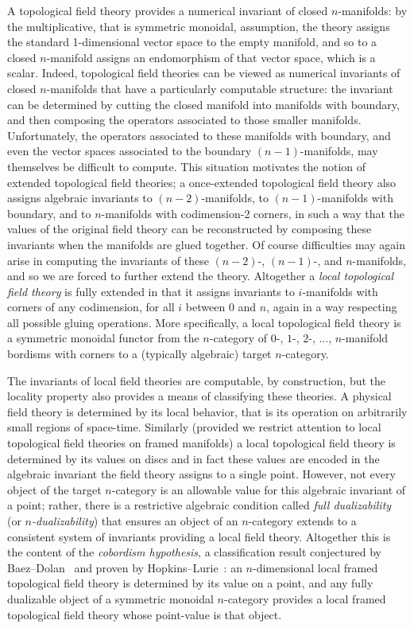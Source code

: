\documentclass{amsart}
\begin{document}
A topological field theory provides a numerical invariant of closed $n$-manifolds: by the multiplicative, that is symmetric monoidal, assumption, the theory assigns the standard 1-dimensional vector space to the empty manifold, and so to a closed $n$-manifold assigns an endomorphism of that vector space, which is a scalar.  Indeed, topological field theories can be viewed as numerical invariants of closed $n$-manifolds that have a particularly computable structure: the invariant can be determined by cutting the closed manifold into manifolds with boundary, and then composing the operators associated to those smaller manifolds.  Unfortunately, the operators associated to these manifolds with boundary, and even the vector spaces associated to the boundary $(n-1)$-manifolds, may themselves be difficult to compute.  This situation motivates the notion of extended topological field theories; a once-extended topological field theory also assigns algebraic invariants to $(n-2)$-manifolds, to $(n-1)$-manifolds with boundary, and to $n$-manifolds with codimension-2 corners, in such a way that the values of the original field theory can be reconstructed by composing these invariants when the manifolds are glued together.  Of course difficulties may again arise in computing the invariants of these $(n-2)$-, $(n-1)$-, and $n$-manifolds, and so we are forced to further extend the theory.  Altogether a \emph{local topological field theory} is fully extended in that it assigns invariants to $i$-manifolds with corners of any codimension, for all $i$ between $0$ and $n$, again in a way respecting all possible gluing operations.  More specifically, a local topological field theory is a symmetric monoidal functor from the $n$-category of $0$-, $1$-, $2$-, ..., $n$-manifold bordisms with corners to a (typically algebraic) target $n$-category.

The invariants of local field theories are computable, by construction, but the locality property also provides a means of classifying these theories.  A physical field theory is determined by its local behavior, that is its operation on arbitrarily small regions of space-time.  Similarly (provided we restrict attention to local topological field theories on framed manifolds) a local topological field theory is determined by its values on discs and in fact these values are encoded in the algebraic invariant the field theory assigns to a single point.  However, not every object of the target $n$-category is an allowable value for this algebraic invariant of a point; rather, there is a restrictive algebraic condition called \emph{full dualizability} (or \emph{$n$-dualizability}) that ensures an object of an $n$-category extends to a consistent system of invariants providing a local field theory.  Altogether this is the content of the \emph{cobordism hypothesis}, a classification result conjectured by Baez--Dolan~\cite{MR1355899} and proven by Hopkins--Lurie~\cite{lurie-ch}: an $n$-dimensional local framed topological field theory is determined by its value on a point, and any fully dualizable object of a symmetric monoidal $n$-category provides a local framed topological field theory whose point-value is that object.
\end{document}
